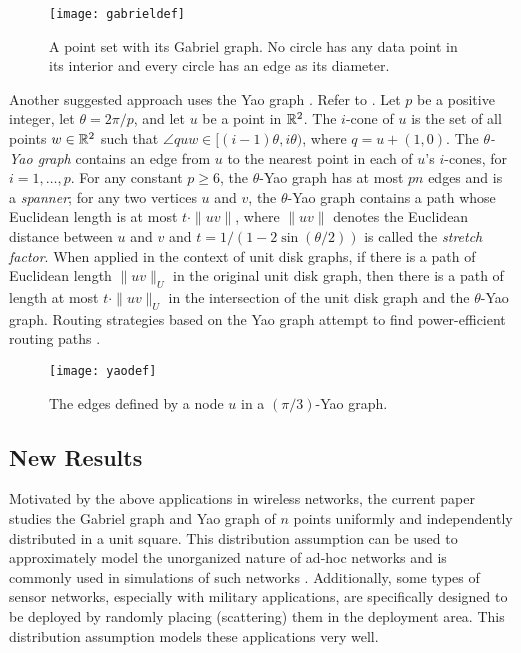 \documentclass[lotsofwhite,charterfonts]{patmorin}
\begin{document}
\begin{figure}
\begin{center}{\texttt{[image: gabrieldef]}}\end{center}
\caption{A point set with its Gabriel graph. No circle has
any data point in its interior and every circle has an edge
as its diameter.}
\end{figure}

Another suggested approach uses the Yao graph \cite{y82}. Refer to
. Let $p$ be a positive integer, let $\theta=2\pi/p$,
and let $u$ be a point in $\mathbb{R}^2$.  The $i$-cone of $u$ is the set of all
points $w\in\mathbb{R}^2$ such that $\angle quw \in [(i-1)\theta,i\theta)$, where
$q = u+(1,0)$.  The \emph{$\theta$-Yao graph} contains an edge from $u$
to the nearest point in each of $u$'s $i$-cones, for $i=1,\ldots,p$.
For any constant $p\ge 6$, the $\theta$-Yao graph has at most $pn$
edges and is a \emph{spanner}; for any two vertices $u$ and $v$, the
$\theta$-Yao graph contains a path whose Euclidean length is at most
$t\cdot\|uv\|$, where $\|uv\|$ denotes the Euclidean distance between $u$
and $v$ and $t=1/(1-2\sin(\theta/2))$ is called the \emph{stretch factor}.
When applied in the context of unit disk graphs, if there is a path of
Euclidean length $\|uv\|_U$ in the original unit disk graph, then there
is a path of length at most $t\cdot\|uv\|_U$ in the intersection of
the unit disk graph and the $\theta$-Yao graph.  Routing strategies
based on the Yao graph attempt to find power-efficient routing paths
\cite{glsv02,lwy01,wlbw01,svz07}.

\begin{figure}
\begin{center}{\texttt{[image: yaodef]}}\end{center}
\caption{The edges defined by a node $u$ in a $(\pi/3)$-Yao graph.}
\end{figure}


\subsection{New Results}

Motivated by the above applications in wireless networks, the current paper
studies the Gabriel graph and Yao graph of $n$ points uniformly and
independently distributed in a unit square.  This distribution assumption
can be used to approximately model the unorganized nature of ad-hoc
networks and is commonly used in simulations of such networks \cite{tma09}.
Additionally, some types of sensor networks, especially with military
applications, are specifically designed to be deployed by randomly placing
(scattering) them in the deployment area. This distribution assumption
models these applications very well.
\end{document}
